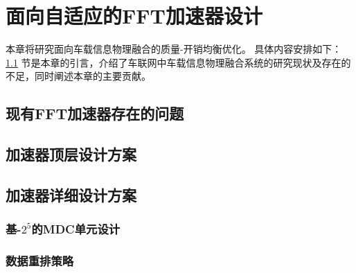 \chapter[\hspace{0pt}面向自适应的FFT加速器设计]{{\hspace{-5pt}面向自适应的FFT加速器设计}}
\removelofgap
\removelotgap
本章将研究面向车载信息物理融合的质量-开销均衡优化。
具体内容安排如下：
\ref{section 3-1} 节是本章的引言，介绍了车联网中车载信息物理融合系统的研究现状及存在的不足，同时阐述本章的主要贡献。
\section[\hspace{-2pt}现有FFT加速器存在的问题]{{ \hspace{-8pt}现有FFT加速器存在的问题}}\label{section 3-1}

\section[\hspace{-2pt}加速器顶层设计方案]{{ \hspace{-8pt}加速器顶层设计方案}}\label{section 3-2}


\section[\hspace{-2pt}加速器详细设计方案]{{ \hspace{-8pt}加速器详细设计方案}}\label{section 3-3}

\subsection[\hspace{-2pt}基-$2^5$的MDC单元设计]{{ \hspace{-8pt}基-$2^5$的MDC单元设计}}\label{section 3-3}


\subsection[\hspace{-2pt}数据重排策略]{{ \hspace{-8pt}数据重排策略}}\label{section 3-3}

